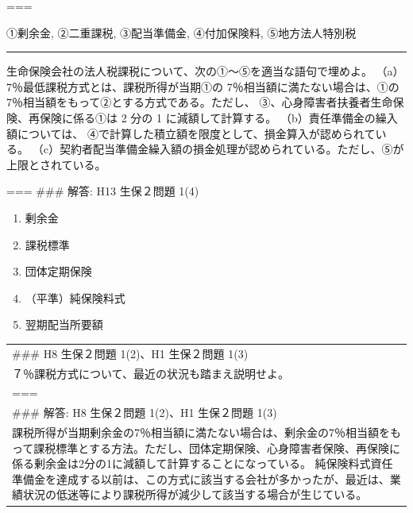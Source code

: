 \documentclass[report,gutter=10mm,fore-edge=10mm,uplatex,dvipdfmx]{jlreq}
\begin{document}
===


①剰余金, ②二重課税, ③配当準備金, ④付加保険料, ⑤地方法人特別税

\begin{center}\rule{0.5\linewidth}{0.5pt}\end{center}


生命保険会社の法人税課税について、次の①～⑤を適当な語句で埋めよ。
（a）7％最低課税方式とは、課税所得が当期①の
7％相当額に満たない場合は、①の
7％相当額をもって②とする方式である。ただし、
③、心身障害者扶養者生命保険、再保険に係る①は 2 分の 1
に減額して計算する。 （b）責任準備金の繰入額については、
④で計算した積立額を限度として、損金算入が認められている。
（c）契約者配当準備金繰入額の損金処理が認められている。ただし、⑤が上限とされている。

=== \#\#\# 解答: H13 生保２問題 1(4)

\begin{enumerate}
\tightlist
\item
  剰余金
\item
  課税標準
\item
  団体定期保険
\item
  （平準）純保険料式
\item
  翌期配当所要額
\end{enumerate}

\begin{longtable}[]{@{}l@{}}
\toprule
\endhead
\begin{minipage}[t]{0.07\columnwidth}\raggedright
\#\#\# H8 生保２問題 1(2)、H1 生保２問題 1(3)\strut
\end{minipage}\tabularnewline
\begin{minipage}[t]{0.07\columnwidth}\raggedright
７％課税方式について、最近の状況も踏まえ説明せよ。\strut
\end{minipage}\tabularnewline
\begin{minipage}[t]{0.07\columnwidth}\raggedright
===\strut
\end{minipage}\tabularnewline
\begin{minipage}[t]{0.07\columnwidth}\raggedright
\#\#\# 解答: H8 生保２問題 1(2)、H1 生保２問題 1(3)\strut
\end{minipage}\tabularnewline
\begin{minipage}[t]{0.07\columnwidth}\raggedright
課税所得が当期剰余金の7％相当額に満たない場合は、剰余金の7％相当額をもって課税標準とする方法。ただし、団体定期保険、心身障害者保険、再保険に係る剰余金は2分の1に減額して計算することになっている。
純保険料式資任準備金を達成する以前は、この方式に該当する会社が多かったが、最近は、業績状況の低迷等により課税所得が減少して該当する場合が生じている。\strut
\end{minipage}\tabularnewline
\bottomrule
\end{longtable}
\end{document}

